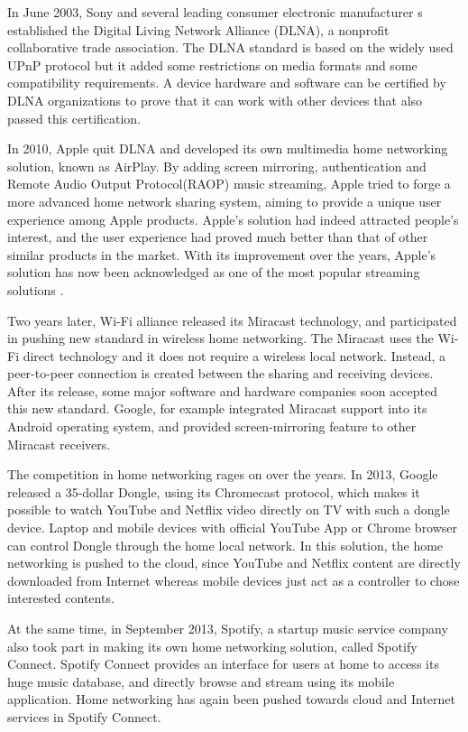 In June 2003, Sony and several leading consumer electronic manufacturer s
established the Digital Living Network Alliance (DLNA), a nonprofit 
collaborative trade association. The DLNA standard is based on the widely used UPnP 
protocol but it added some restrictions on media formats and some compatibility 
requirements. A device hardware and software can be certified by DLNA 
organizations to prove that it can work with other devices that also passed 
this certification. 

In 2010, Apple quit DLNA and developed its own multimedia home networking 
solution, known as AirPlay. By adding screen mirroring, authentication and Remote 
Audio Output Protocol(RAOP) music streaming, Apple tried to forge a more advanced 
home network sharing system, aiming to provide a unique user experience among Apple 
products. Apple's solution had indeed attracted people's interest, and the user experience 
had proved much better than that of other similar products in the market. With its improvement
 over the years,  Apple's solution has now been acknowledged as one of the most popular streaming 
solutions .

Two years later, Wi-Fi alliance released its Miracast technology, and 
participated in pushing new standard in wireless home networking. The Miracast 
uses the Wi-Fi direct technology and it does not require a wireless local 
network. Instead, a peer-to-peer connection is created between the sharing and 
receiving devices. After its release, some major software and hardware 
companies soon accepted this new standard. Google, for example integrated Miracast 
support into its Android operating system, and provided screen-mirroring feature 
to other Miracast receivers. 

The competition in home networking rages on over the years. In 2013, Google released a 35-dollar 
Dongle, using its Chromecast protocol, which makes it possible to watch 
YouTube and Netflix video directly on TV with such a dongle device. Laptop and mobile 
devices with official YouTube App or Chrome browser can control Dongle 
through the home local network. In this solution, the home networking is pushed to the 
cloud, since YouTube and Netflix content are directly downloaded from Internet whereas
mobile devices just act as a controller to chose interested contents. 

At the same time, in September 2013, Spotify, a startup music service 
company also took part in making its own home networking solution, called 
Spotify Connect. Spotify Connect provides an interface for users at home to access its huge 
music database, and directly browse and stream using its mobile application. Home 
networking has again been pushed towards cloud and Internet services in Spotify Connect. 

